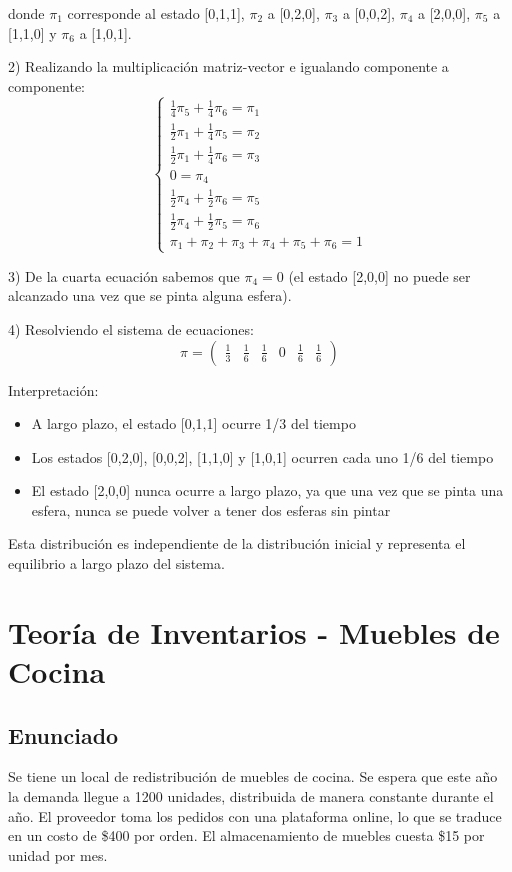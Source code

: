 \documentclass[12pt]{article}
\begin{document}
donde $\pi_1$ corresponde al estado [0,1,1], $\pi_2$ a [0,2,0], $\pi_3$ a [0,0,2], $\pi_4$ a [2,0,0], $\pi_5$ a [1,1,0] y $\pi_6$ a [1,0,1].

2) Realizando la multiplicación matriz-vector e igualando componente a componente:
\[
\begin{cases}
\frac{1}{4}\pi_5 + \frac{1}{4}\pi_6 = \pi_1 \\
\frac{1}{2}\pi_1 + \frac{1}{4}\pi_5 = \pi_2 \\
\frac{1}{2}\pi_1 + \frac{1}{4}\pi_6 = \pi_3 \\
0 = \pi_4 \\
\frac{1}{2}\pi_4 + \frac{1}{2}\pi_6 = \pi_5 \\
\frac{1}{2}\pi_4 + \frac{1}{2}\pi_5 = \pi_6 \\
\pi_1 + \pi_2 + \pi_3 + \pi_4 + \pi_5 + \pi_6 = 1
\end{cases}
\]

3) De la cuarta ecuación sabemos que $\pi_4 = 0$ (el estado [2,0,0] no puede ser alcanzado una vez que se pinta alguna esfera).

4) Resolviendo el sistema de ecuaciones:
\[
\pi = \begin{pmatrix} \frac{1}{3} & \frac{1}{6} & \frac{1}{6} & 0 & \frac{1}{6} & \frac{1}{6} \end{pmatrix}
\]

Interpretación:
\begin{itemize}
    \item A largo plazo, el estado [0,1,1] ocurre 1/3 del tiempo
    \item Los estados [0,2,0], [0,0,2], [1,1,0] y [1,0,1] ocurren cada uno 1/6 del tiempo
    \item El estado [2,0,0] nunca ocurre a largo plazo, ya que una vez que se pinta una esfera, nunca se puede volver a tener dos esferas sin pintar
\end{itemize}

Esta distribución es independiente de la distribución inicial y representa el equilibrio a largo plazo del sistema.

\section{Teoría de Inventarios - Muebles de Cocina}

\subsection{Enunciado}
Se tiene un local de redistribución de muebles de cocina. Se espera que este año la demanda llegue a 1200 unidades, distribuida de manera constante durante el año. El proveedor toma los pedidos con una plataforma online, lo que se traduce en un costo de \$400 por orden. El almacenamiento de muebles cuesta \$15 por unidad por mes.
\end{document}
